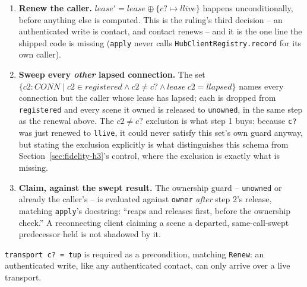 \documentclass[a4paper,10pt,fleqn]{article}
\begin{document}
\begin{enumerate}
  \item \textbf{Renew the caller.} \texttt{$lease' = lease \oplus
    \{c? \mapsto llive\}$} happens unconditionally, before anything else is
    computed. This is the ruling's third decision -- an authenticated
    write is contact, and contact renews -- and it is the one line the
    shipped code is missing (\texttt{apply} never calls
    \texttt{HubClientRegistry.record} for its own caller).
  \item \textbf{Sweep every \emph{other} lapsed connection.} The set
    \(\{c2 : CONN \mathbin{|} c2 \in registered \land c2 \neq c? \land
    lease~c2 = llapsed\}\) names every connection but the caller whose
    lease has lapsed; each is dropped from \texttt{registered} and every
    scene it owned is released to \texttt{unowned}, in the same step as
    the renewal above. The \(c2 \neq c?\) exclusion is what step 1 buys:
    because \texttt{c?} was just renewed to \texttt{llive}, it could never
    satisfy this set's own guard anyway, but stating the exclusion
    explicitly is what distinguishes this schema from
    Section~\ref{sec:fidelity-h3}'s control, where the exclusion is
    exactly what is missing.
  \item \textbf{Claim, against the swept result.} The ownership guard --
    \texttt{unowned} or already the caller's -- is evaluated against
    \texttt{owner} \emph{after} step 2's release, matching
    \texttt{apply}'s docstring: ``reaps and releases first, before the
    ownership check.'' A reconnecting client claiming a scene a departed,
    same-call-swept predecessor held is not shadowed by it.
\end{enumerate}

\texttt{transport~c? = tup} is required as a precondition, matching
\texttt{Renew}: an authenticated write, like any authenticated contact,
can only arrive over a live transport.
\end{document}
